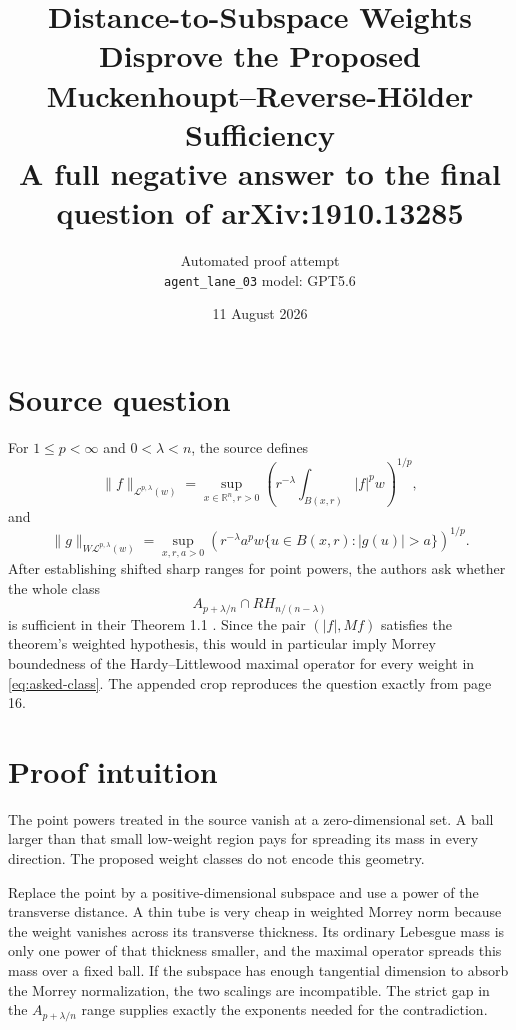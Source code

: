\documentclass[10pt]{article}
\title{Distance-to-Subspace Weights Disprove the Proposed\\
Muckenhoupt--Reverse-Hölder Sufficiency\\
\large A full negative answer to the final question of arXiv:1910.13285}
\author{Automated proof attempt\\
\texttt{agent\_lane\_03} \quad model: GPT5.6}
\date{11 August 2026}
\newcommand{\R}{\mathbb R}
\newcommand{\Mor}{\mathcal L}
\newcommand{\WMor}{W\mathcal L}
\begin{document}
\maketitle

\begin{center}
\end{center}

\section*{Source question}

For $1\le p<\infty$ and $0<\lambda<n$, the source defines
\[
 \|f\|_{\Mor^{p,\lambda}(w)}
 =\sup_{x\in\R^n,r>0}
 \left(r^{-\lambda}\int_{B(x,r)}|f|^p w\right)^{1/p},
\]
and
\[
 \|g\|_{\WMor^{p,\lambda}(w)}
 =\sup_{x,r,a>0}
 \left(r^{-\lambda}a^p
 w\{u\in B(x,r):|g(u)|>a\}\right)^{1/p}.
\]
After establishing shifted sharp ranges for point powers, the authors ask
whether the whole class
\begin{equation}\label{eq:asked-class}
 A_{p+\lambda/n}\cap RH_{n/(n-\lambda)}
\end{equation}
is sufficient in their Theorem 1.1 \cite{source}.  Since the pair
$(|f|,Mf)$ satisfies the theorem's weighted hypothesis, this would in
particular imply Morrey boundedness of the Hardy--Littlewood maximal operator
for every weight in \eqref{eq:asked-class}.  The appended crop reproduces the
question exactly from page 16.

\section*{Proof intuition}

The point powers treated in the source vanish at a zero-dimensional set.  A
ball larger than that small low-weight region pays for spreading its mass in
every direction.  The proposed weight classes do not encode this geometry.

Replace the point by a positive-dimensional subspace and use a power of the
transverse distance.  A thin tube is very cheap in weighted Morrey norm
because the weight vanishes across its transverse thickness.  Its ordinary
Lebesgue mass is only one power of that thickness smaller, and the maximal
operator spreads this mass over a fixed ball.  If the subspace has enough
tangential dimension to absorb the Morrey normalization, the two scalings
are incompatible.  The strict gap in the $A_{p+\lambda/n}$ range supplies
exactly the exponents needed for the contradiction.
\end{document}
